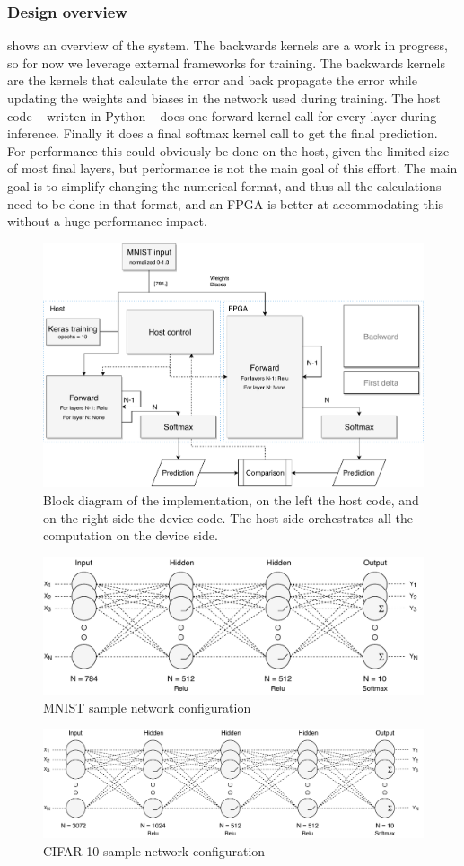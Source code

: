 \documentclass[techrep,english]{ipsj} %
\begin{document}
{\subsubsection{Design overview}
 shows an overview of the system.
The backwards kernels are a work in progress, so for now we leverage external frameworks for training.
The backwards kernels are the kernels that calculate the error and back propagate the error while updating the weights and biases in the network used during training.
The host code -- written in Python -- does one forward kernel call for every layer during inference.
Finally it does a final softmax kernel call to get the final prediction.
For performance this could obviously be done on the host, given the limited size of most final layers, but performance is not the main goal of this effort.
The main goal is to simplify changing the numerical format, and thus all the calculations need to be done in that format, and an FPGA is better at accommodating this without a huge performance impact. %

\begin{figure}[p]
  \centering
  \includegraphics[width=0.7\linewidth]{block-diagram.pdf}
  \caption{Block diagram of the implementation, on the left the host code, and on the right side the device code. The host side orchestrates all the computation on the device side.}\label{fig:block-diagram}
\end{figure}

\begin{figure}[p]
  \centering
  \includegraphics[width=0.6\linewidth]{mnist-network.pdf}
  \caption{MNIST sample network configuration}\label{fig:mnist-network}
\end{figure}
\begin{figure}[p]
  \centering
  \includegraphics[width=0.8\linewidth]{cifar10-network.pdf}
  \caption{CIFAR-10 sample network configuration}\label{fig:cifar10-network}
\end{figure}

}
\end{document}
